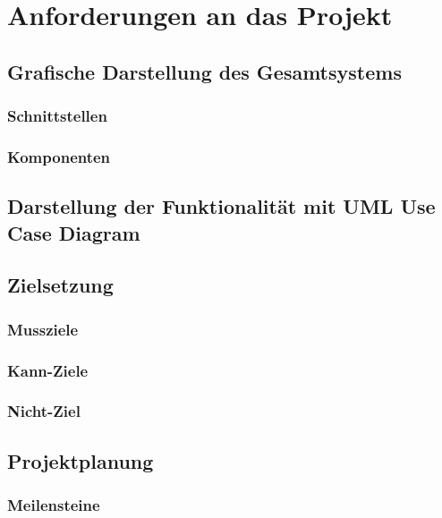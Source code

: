 \chapter{Anforderungen an das Projekt}
\section{Grafische Darstellung des Gesamtsystems}
\subsection{Schnittstellen}
\subsection{Komponenten}

\section{Darstellung der Funktionalität mit UML Use Case Diagram}

\section{Zielsetzung}
\subsection{Mussziele}
\subsection{Kann-Ziele}
\subsection{Nicht-Ziel}

\section{Projektplanung}
\subsection{Meilensteine}